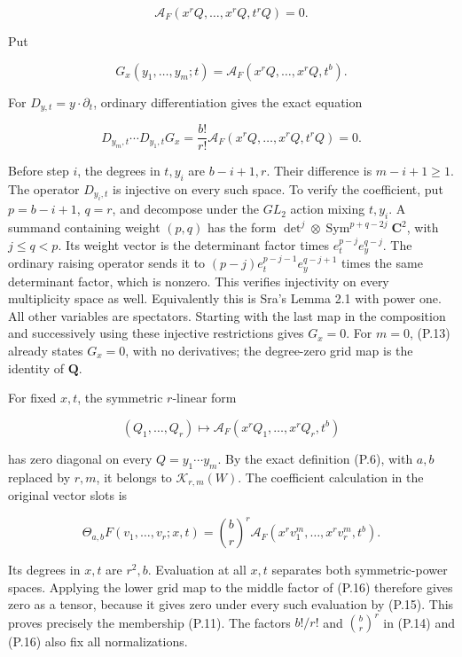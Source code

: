 \documentclass[
  10pt,
]{article}
\begin{document}
\[
\mathcal A_F(x^rQ,\ldots,x^rQ,t^rQ)=0.
\tag{P.13}
\]

Put

\[
G_x(y_1,\ldots,y_m;t)
=\mathcal A_F(x^rQ,\ldots,x^rQ,t^b).
\]

For \(D_{y,t}=y\cdot\partial_t\), ordinary differentiation gives the
exact equation

\[
D_{y_m,t}\cdots D_{y_1,t}G_x
=\frac{b!}{r!}
\mathcal A_F(x^rQ,\ldots,x^rQ,t^rQ)=0.
\tag{P.14}
\]

Before step \(i\), the degrees in \(t,y_i\) are \(b-i+1,r\). Their
difference is \(m-i+1\ge1\). The operator \(D_{y_i,t}\) is injective on
every such space. To verify the coefficient, put \(p=b-i+1\), \(q=r\),
and decompose under the \(GL_2\) action mixing \(t,y_i\). A summand
containing weight \((p,q)\) has the form
\(\det^j\otimes\operatorname{Sym}^{p+q-2j}\mathbf C^2\), with
\(j\le q<p\). Its weight vector is the determinant factor times
\(e_t^{p-j}e_y^{q-j}\). The ordinary raising operator sends it to
\((p-j)e_t^{p-j-1}e_y^{q-j+1}\) times the same determinant factor, which
is nonzero. This verifies injectivity on every multiplicity space as
well. Equivalently this is Sra's Lemma 2.1 with power one. All other
variables are spectators. Starting with the last map in the composition
and successively using these injective restrictions gives \(G_x=0\). For
\(m=0\), (P.13) already states \(G_x=0\), with no derivatives; the
degree-zero grid map is the identity of \(\mathbf Q\).

For fixed \(x,t\), the symmetric \(r\)-linear form

\[
(Q_1,\ldots,Q_r)\longmapsto
\mathcal A_F(x^rQ_1,\ldots,x^rQ_r,t^b)
\tag{P.15}
\]

has zero diagonal on every \(Q=y_1\cdots y_m\). By the exact definition
(P.6), with \(a,b\) replaced by \(r,m\), it belongs to
\(\mathcal K_{r,m}(W)\). The coefficient calculation in the original
vector slots is

\[
\Theta_{a,b}F(v_1,\ldots,v_r;x,t)
=\binom br^{r}
\mathcal A_F(x^rv_1^m,\ldots,x^rv_r^m,t^b).
\tag{P.16}
\]

Its degrees in \(x,t\) are \(r^2,b\). Evaluation at all \(x,t\)
separates both symmetric-power spaces. Applying the lower grid map to
the middle factor of (P.16) therefore gives zero as a tensor, because it
gives zero under every such evaluation by (P.15). This proves precisely
the membership (P.11). The factors \(b!/r!\) and \(\binom br^r\) in
(P.14) and (P.16) also fix all normalizations.
\end{document}
